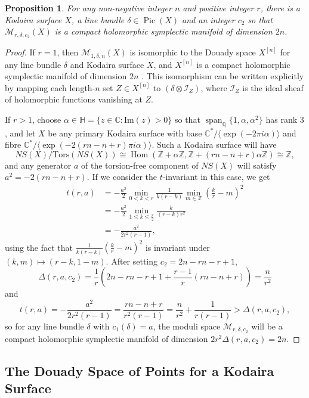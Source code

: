 \documentclass{article}[12pt]
\newtheorem{proposition}[theorem]{Proposition}
\theoremstyle{definition}
\theoremstyle{remark}
\newcommand \Z{\mathbb Z}
\newcommand \Q{\mathbb Q}
\newcommand \C{\mathbb C}
\numberwithin{equation}{section}
\newcommand \mc{\mathcal}
\newcommand \mb{\mathbb}
\DeclareMathOperator{\Hom}{Hom}
\DeclareMathOperator{\Pic}{Pic}
\DeclareMathOperator{\Span}{span}
\begin{document}
\begin{proposition}
	For any non-negative integer $n$ and positive integer $r$, there is a Kodaira surface $X$, a line bundle $\delta \in \Pic(X)$ and an integer $c_2$ so that $\mc{M}_{r,\delta,c_2}(X)$ is a compact holomorphic symplectic manifold of dimension $2n$.
\end{proposition}
\begin{proof}
	If $r=1$, then $\mc{M}_{1, \delta, n}(X)$ is isomorphic to the Douady space $X^{[n]}$ for any line bundle $\delta$ and Kodaira surface $X$, and $X^{[n]}$ is a compact holomorphic symplectic manifold of dimension $2n$ \cite{Beau}. This isomorphism can be written explicitly by mapping each length-$n$ set $Z \in X^{[n]}$ to $(\delta\otimes \mc{I}_Z)$, where $\mc{I}_Z$ is the ideal sheaf of holomorphic functions vanishing at $Z$.
	
	If $r>1$, choose $\alpha \in \mb{H}=\{z \in \C:\text{Im}(z)>0\}$ so that $\Span_\Q\{1,\alpha,\alpha^2\}$ has rank $3$, and let $X$ be any primary Kodaira surface with base $\C^*/\langle \exp(-2\pi i\alpha)\rangle$ and fibre $\C^*/\langle \exp(-2(rn-n+r)\pi i\alpha)\rangle$. Such a Kodaira surface will have $$NS(X)/\text{Tors}(NS(X))\cong\Hom(\Z+\alpha\Z, \Z+(rn-n+r)\alpha\Z)\cong \Z,$$ and any generator $a$ of the torsion-free component of $NS(X)$ will satisfy $a^2=-2(rn-n+r)$. If we consider the $t$-invariant in this case, we get \begin{align*}t(r,a)&=-\frac{a^2}{2}\min_{0<k<r} \frac{1}{k(r-k)} \min_{m \in \Z} \left(\frac{k}{r}-m \right)^2\\
		&=-\frac{a^2}{2}\min_{1\leq k\leq \frac{r}{2}} \frac{k}{(r-k)r^2}\\ &=-\frac{a^2}{2r^2(r-1)},\end{align*}
	using the fact that $\frac{1}{k(r-k)}\left(\frac{k}{r}-m\right)^2$ is invariant under $(k,m)\mapsto (r-k, 1-m)$. After setting $c_2=2n-rn-r+1$, $$\Delta(r,a,c_2)=\frac{1}{r}\left(2n-rn-r+1+\frac{r-1}{r}(rn-n+r)\right)=\frac{n}{r^2}$$
	and $$t(r,a)=-\frac{a^2}{2r^2(r-1)}=\frac{rn-n+r}{r^2(r-1)}=\frac{n}{r^2}+\frac{1}{r(r-1)}>\Delta(r,a,c_2),$$
	so for any line bundle $\delta$ with $c_1(\delta)=a$, the moduli space $\mc{M}_{r,\delta,c_2}$ will be a compact holomorphic symplectic manifold of dimension $2r^2\Delta(r,a,c_2)=2n$. 
\end{proof}

\subsection{The Douady Space of Points for a Kodaira Surface}\label{Douady}
\end{document}
